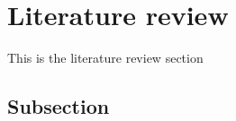 \section{Literature review}\label{Section label}
This is the literature review section
\subsection{Subsection}\label{subsection}